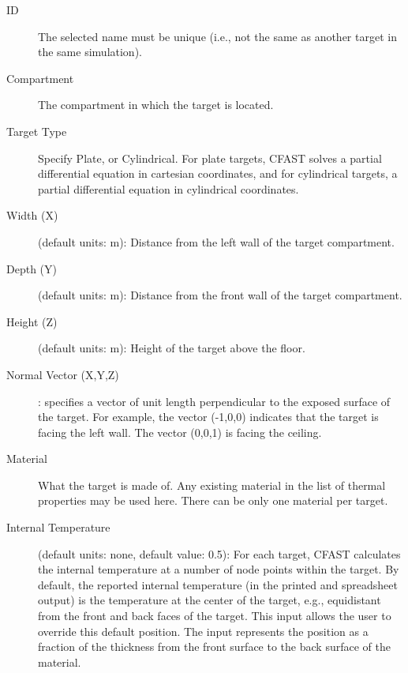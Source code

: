 \begin{description}
\item[ID] The selected name must be unique (i.e., not the same as another target in the same simulation).

\item[Compartment] The compartment in which the target is located.

\item[Target Type] Specify Plate, or Cylindrical.  For plate targets, CFAST solves a partial differential equation in cartesian coordinates, and for cylindrical targets, a partial differential equation in cylindrical coordinates.

\item[Width (X)] (default units: m): Distance from the left wall of the target compartment.

\item[Depth (Y)] (default units: m): Distance from the front wall of the target compartment.

\item[Height (Z)] (default units: m): Height of the target above the floor.

\item[Normal Vector (X,Y,Z)]: specifies a vector of unit length perpendicular to the exposed surface of the target. For example, the vector (-1,0,0) indicates that the target is facing the left wall. The vector (0,0,1) is facing the ceiling.

\item[Material] What the target is made of. Any existing material in the list of thermal properties may be used here. There can be only one material per target.

\item[Internal Temperature] (default units: none, default value: 0.5): For each target, CFAST calculates the internal temperature at a number of node points within the target. By default, the reported internal temperature (in the printed and spreadsheet output) is the temperature at the center of the target, e.g., equidistant from the front and back faces of the target. This input allows the user to override this default position. The input represents the position as a fraction of the thickness from the front surface to the back surface of the material.
\end{description}

